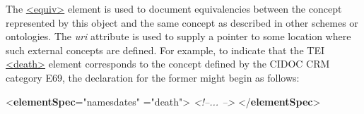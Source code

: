 The \hyperref[TEI.equiv]{<equiv>} element is used to document equivalencies between the concept represented by this object and the same concept as described in other schemes or ontologies. The {\itshape uri} attribute is used to supply a pointer to some location where such external concepts are defined. For example, to indicate that the TEI \hyperref[TEI.death]{<death>} element corresponds to the concept defined by the CIDOC CRM category E69, the declaration for the former might begin as follows: \par\bgroup{}\exampleFont \begin{shaded}\noindent\mbox{}{<\textbf{elementSpec}\hspace*{1em}{module}="{namesdates}"\mbox{}\newline 
\hspace*{1em}{ident}="{death}">}\mbox{}\newline 
{}\mbox{}\newline 
{}\mbox{}\newline 
\textit{<!--... -->}\mbox{}\newline 
{}\mbox{}\newline 
{</\textbf{elementSpec}>}\end{shaded}\egroup\par \par
